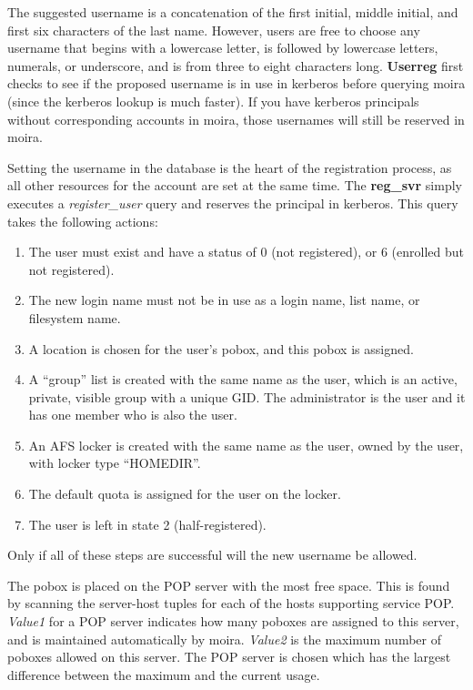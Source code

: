 The suggested username is a concatenation of the first initial, middle
initial, and first six characters of the last name.  However, users
are free to choose any username that begins with a lowercase letter, is
followed by lowercase letters, numerals, or underscore, and is from
three to eight characters long.  {\bf Userreg} first checks to see if
the proposed username is in use in kerberos before querying moira
(since the kerberos lookup is much faster).  If you have kerberos
principals without corresponding accounts in moira, those usernames
will still be reserved in moira.

Setting the username in the database is the heart of the registration
process, as all other resources for the account are set at the same
time.  The {\bf reg\_svr} simply executes a {\em register\_user} query and
reserves the principal in kerberos.  This query takes the following
actions:
\begin{enumerate}
\item The user must exist and have a status of 0 (not registered), or 6
(enrolled but not registered).
\item The new login name must not be in use as a login name, list name, or
filesystem name.
\item A location is chosen for the user's pobox, and this pobox is assigned.
\item A ``group'' list is created with the same name as the user, which is
an active, private, visible group with a unique GID.  The
administrator is the user and it has one member who is also the user.
\item An AFS locker is created with the same name as the user, owned
by the user, with locker type ``HOMEDIR''.
\item The default quota is assigned for the user on the locker.
\item The user is left in state 2 (half-registered).
\end{enumerate}
Only if all of these steps are successful will the new username be
allowed.

The pobox is placed on the POP server with the most free space.  This
is found by scanning the server-host tuples for each of the hosts
supporting service POP.  {\em Value1} for a POP server indicates how
many poboxes are assigned to this server, and is maintained
automatically by moira.  {\em Value2} is the maximum number of poboxes
allowed on this server.  The POP server is chosen which has the
largest difference between the maximum and the current usage.


